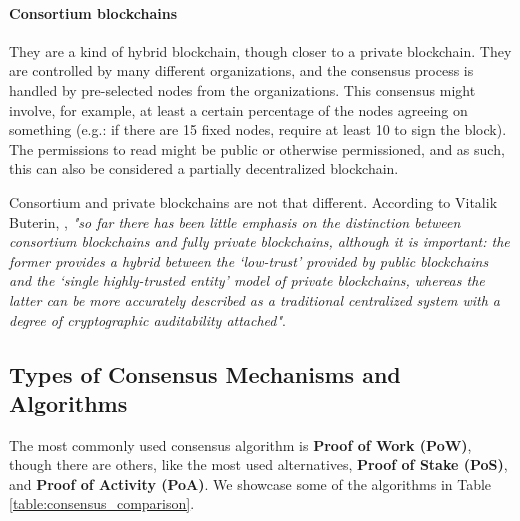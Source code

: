     \paragraph{Consortium blockchains} They are a kind of hybrid blockchain, though closer to a private blockchain. They are controlled by many different organizations, and the consensus process is handled by pre-selected nodes from the organizations. This consensus might involve, for example, at least a certain percentage of the nodes agreeing on something (e.g.: if there are 15 fixed nodes, require at least 10 to sign the block). The permissions to read might be public or otherwise permissioned, and as such, this can also be considered a partially decentralized blockchain.

    Consortium and private blockchains are not that different. According to Vitalik Buterin, \cite{Buterin2015}, \textit{"so far there has been little emphasis on the distinction between consortium blockchains and fully private blockchains, although it is important: the former provides a hybrid between the ‘low-trust’ provided by public blockchains and the ‘single highly-trusted entity’ model of private blockchains, whereas the latter can be more accurately described as a traditional centralized system with a degree of cryptographic auditability attached"}.
    \subsection{Types of Consensus Mechanisms and Algorithms}
    
     The most commonly used consensus algorithm is \textbf{Proof of Work (PoW)}, though there are others, like the most used alternatives, \textbf{Proof of Stake (PoS)}, and \textbf{Proof of Activity (PoA)}. We showcase some of the algorithms in Table \ref{table:consensus_comparison}.
    



